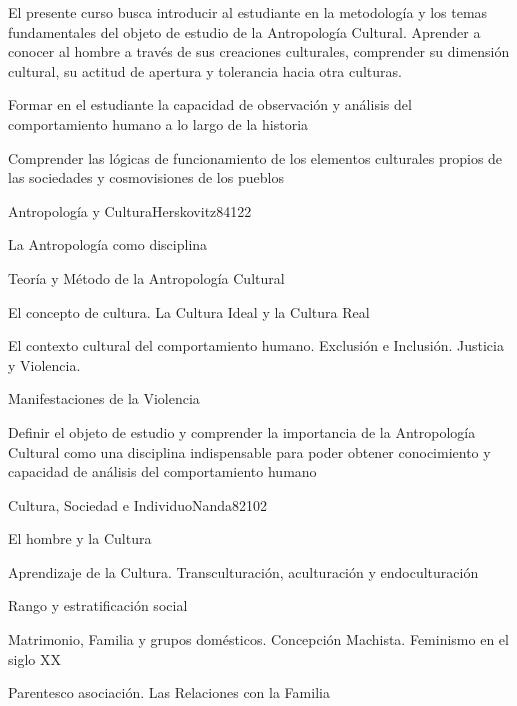 \begin{syllabus}


\begin{justification}    
El presente curso busca introducir al estudiante en la metodología y los temas fundamentales del 
objeto de estudio de la Antropología Cultural. Aprender a conocer al hombre a través de sus 
creaciones culturales, comprender su dimensión cultural, su actitud de apertura y 
tolerancia hacia otra culturas.
\end{justification}

\begin{goals}
\item Formar en el estudiante la capacidad de observación y análisis del comportamiento humano a lo largo de la historia  
\item Comprender las lógicas de funcionamiento de los elementos culturales propios de las sociedades y cosmovisiones de los pueblos
\end{goals}

\begin{outcomes}
\end{outcomes}

\begin{unit}{Antropología y Cultura}{Herskovitz84}{12}{2}
   \begin{topics}
      \item La Antropología como disciplina
	\item Teoría y Método de la Antropología Cultural
	\item El concepto de cultura. La Cultura Ideal y la Cultura Real
	\item El contexto cultural del comportamiento humano. Exclusión e Inclusión. Justicia y Violencia.
	\item Manifestaciones de la Violencia
   \end{topics}

   \begin{unitgoals}
      \item Definir el objeto de estudio y comprender la importancia de la Antropología Cultural como una disciplina indispensable para poder obtener conocimiento y capacidad de análisis del comportamiento humano
   \end{unitgoals}
\end{unit}

\begin{unit}{Cultura, Sociedad e Individuo}{Nanda82}{10}{2}
   \begin{topics}
      \item El hombre y la Cultura
	\item Aprendizaje de la Cultura. Transculturación, aculturación y endoculturación
	\item Rango y estratificación social
	\item Matrimonio, Familia y grupos domésticos. Concepción Machista. Feminismo en el siglo XX
	\item Parentesco asociación. Las Relaciones con la Familia
   \end{topics}


\end{unit}
\end{syllabus}

